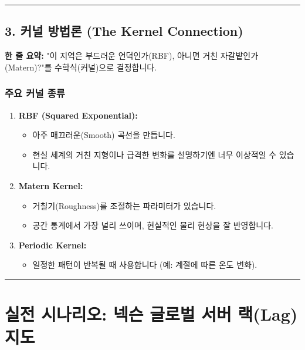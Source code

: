 \documentclass[11pt,a4paper]{book}
\theoremstyle{definition}
\begin{document}
\vspace{0.5cm}\hrule\vspace{0.5cm}

\subsection{3. 커널 방법론 (The Kernel Connection)}


\begin{conceptbox}[title={개념 3: 공간의 질감(Texture) 정의하기}]
\textbf{한 줄 요약:} "이 지역은 부드러운 언덕인가(RBF), 아니면 거친 자갈밭인가(Matern)?"를 수학식(커널)으로 결정합니다.
\end{conceptbox}

\subsubsection*{주요 커널 종류}
\begin{enumerate}
    \item \textbf{RBF (Squared Exponential):}
    \begin{itemize}
        \item 아주 매끄러운(Smooth) 곡선을 만듭니다.
        \item 현실 세계의 거친 지형이나 급격한 변화를 설명하기엔 너무 이상적일 수 있습니다.
    \end{itemize}
    \item \textbf{Matern Kernel:}
    \begin{itemize}
        \item 거칠기(Roughness)를 조절하는 파라미터가 있습니다.
        \item 공간 통계에서 가장 널리 쓰이며, 현실적인 물리 현상을 잘 반영합니다.
    \end{itemize}
    \item \textbf{Periodic Kernel:}
    \begin{itemize}
        \item 일정한 패턴이 반복될 때 사용합니다 (예: 계절에 따른 온도 변화).
    \end{itemize}
\end{enumerate}

\vspace{0.5cm}\hrule\vspace{0.5cm}

\section{실전 시나리오: 넥슨 글로벌 서버 랙(Lag) 지도}
\end{document}
